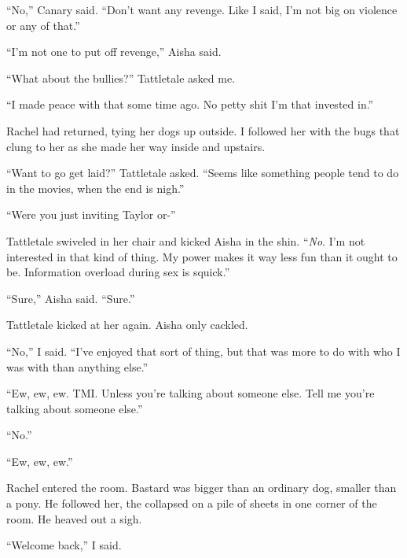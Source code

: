 ``No,'' Canary said.  ``Don't want any revenge.  Like I said, I'm not big on violence or any of that.''



``I'm not one to put off revenge,'' Aisha said.



``What about the bullies?''  Tattletale asked me.



``I made peace with that some time ago.  No petty shit I'm that invested in.''



Rachel had returned, tying her dogs up outside.  I followed her with the bugs that clung to her as she made her way inside and upstairs.



``Want to go get laid?''  Tattletale asked.  ``Seems like something people tend to do in the movies, when the end is nigh.''



``Were you just inviting Taylor or-''



Tattletale swiveled in her chair and kicked Aisha in the shin.  ``\emph{No}.  I'm not interested in that kind of thing.  My power makes it way less fun than it ought to be.  Information overload during sex is squick.''



``Sure,'' Aisha said.  ``Sure.''



Tattletale kicked at her again.  Aisha only cackled.



``No,'' I said.  ``I've enjoyed that sort of thing, but that was more to do with who I was with than anything else.''



``Ew, ew, ew.  TMI.  Unless you're talking about someone else.  Tell me you're talking about someone else.''



``No.''



``Ew, ew, ew.''



Rachel entered the room.  Bastard was bigger than an ordinary dog, smaller than a pony.  He followed her, the collapsed on a pile of sheets in one corner of the room.  He heaved out a sigh.



``Welcome back,'' I said.



